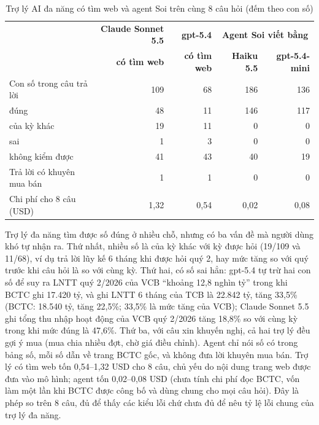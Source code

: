 \documentclass[12pt,a4paper]{report}
\newcommand{\enquote}[1]{“#1”}
\begin{document}
\begin{table}[H]
\centering\small
\caption{Trợ lý AI đa năng có tìm web và agent Soi trên cùng 8 câu hỏi (đếm theo con số)}\label{tab:agent-general}
\begin{tabularx}{\linewidth}{@{}Xrrrr@{}}
\toprule
& \textbf{Claude Sonnet 5.5} & \textbf{gpt-5.4} & \multicolumn{2}{c}{\textbf{Agent Soi viết bằng}} \\
& \textbf{có tìm web} & \textbf{có tìm web} & \textbf{Haiku 5.5} & \textbf{gpt-5.4-mini} \\ \midrule
Con số trong câu trả lời & 109 & 68 & 186 & 136 \\
\quad đúng & 48 & 11 & 146 & 117 \\
\quad của kỳ khác & 19 & 11 & 0 & 0 \\
\quad sai & 1 & 3 & 0 & 0 \\
\quad không kiểm được & 41 & 43 & 40 & 19 \\
Trả lời có khuyên mua bán & 1 & 1 & 0 & 0 \\
Chi phí cho 8 câu (USD) & 1,32 & 0,54 & 0,02 & 0,08 \\
\bottomrule
\end{tabularx}
\end{table}

Trợ lý đa năng tìm được số đúng ở nhiều chỗ, nhưng có ba vấn đề mà người dùng khó tự nhận ra. Thứ nhất, nhiều số là của kỳ
khác với kỳ được hỏi (19/109 và 11/68), ví dụ trả lời lũy kế 6 tháng khi được hỏi quý 2, hay mức tăng so với quý trước khi
câu hỏi là so với cùng kỳ. Thứ hai, có số sai hẳn: gpt-5.4 tự trừ hai con số để suy ra LNTT quý 2/2026 của VCB
\enquote{khoảng 12,8 nghìn tỷ} trong khi BCTC ghi 17.420 tỷ, và ghi LNTT 6 tháng của TCB là 22.842 tỷ, tăng 33,5\% (BCTC:
18.540 tỷ, tăng 22,5\%; 33,5\% là mức tăng của VCB); Claude Sonnet 5.5 ghi tổng thu nhập hoạt động của VCB quý 2/2026 tăng
18,8\% so với cùng kỳ trong khi mức đúng là 47,6\%. Thứ ba, với câu xin khuyến nghị, cả hai trợ lý đều gợi ý mua (mua chia
nhiều đợt, chờ giá điều chỉnh). Agent chỉ nói số có trong bảng số, mỗi số dẫn về trang BCTC gốc, và không đưa lời khuyên mua
bán. Trợ lý có tìm web tốn 0,54--1,32 USD cho 8 câu, chủ yếu do nội dung trang web được đưa vào mô hình; agent tốn
0,02--0,08 USD (chưa tính chi phí đọc BCTC, vốn làm một lần khi BCTC được công bố và dùng chung cho mọi câu hỏi).
Đây là phép so trên 8 câu, đủ để thấy các kiểu lỗi chứ chưa đủ để nêu tỷ lệ lỗi chung của trợ lý đa năng.

\end{document}
